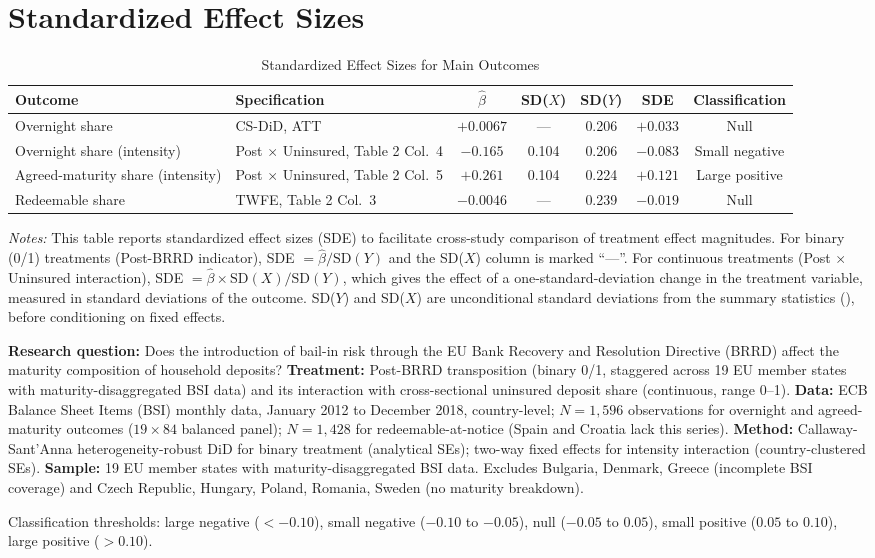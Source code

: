 \documentclass[12pt]{article}
\begin{document}
\section{Standardized Effect Sizes}
\label{sec:sde}

\begin{table}[H]
\centering
\caption{Standardized Effect Sizes for Main Outcomes}
\label{tab:sde}
\begin{adjustbox}{max width=\textwidth}
\begin{tabular}{llccccc}
\toprule
Outcome & Specification & $\hat{\beta}$ & SD($X$) & SD($Y$) & SDE & Classification \\
\midrule
Overnight share & CS-DiD, ATT & $+0.0067$ & --- & 0.206 & $+0.033$ & Null \\
Overnight share (intensity) & Post $\times$ Uninsured, Table 2 Col.\ 4 & $-0.165$ & 0.104 & 0.206 & $-0.083$ & Small negative \\
Agreed-maturity share (intensity) & Post $\times$ Uninsured, Table 2 Col.\ 5 & $+0.261$ & 0.104 & 0.224 & $+0.121$ & Large positive \\
Redeemable share & TWFE, Table 2 Col.\ 3 & $-0.0046$ & --- & 0.239 & $-0.019$ & Null \\
\bottomrule
\end{tabular}
\end{adjustbox}
\par\vspace{0.3em}
{\footnotesize \emph{Notes:} This table reports standardized effect sizes (SDE)
to facilitate cross-study comparison of treatment effect magnitudes.
For binary (0/1) treatments (Post-BRRD indicator), SDE $= \hat{\beta} / \text{SD}(Y)$ and the SD($X$)
column is marked ``---''.
For continuous treatments (Post $\times$ Uninsured interaction), SDE $= \hat{\beta} \times \text{SD}(X) / \text{SD}(Y)$,
which gives the effect of a one-standard-deviation change in the treatment variable,
measured in standard deviations of the outcome.
SD($Y$) and SD($X$) are unconditional standard deviations from the summary
statistics (), before conditioning on fixed effects.

\textbf{Research question:} Does the introduction of bail-in risk through the EU Bank Recovery and Resolution Directive (BRRD) affect the maturity composition of household deposits?
\textbf{Treatment:} Post-BRRD transposition (binary 0/1, staggered across 19 EU member states with maturity-disaggregated BSI data) and its interaction with cross-sectional uninsured deposit share (continuous, range 0--1).
\textbf{Data:} ECB Balance Sheet Items (BSI) monthly data, January 2012 to December 2018, country-level; $N = 1{,}596$ observations for overnight and agreed-maturity outcomes ($19 \times 84$ balanced panel); $N = 1{,}428$ for redeemable-at-notice (Spain and Croatia lack this series).
\textbf{Method:} Callaway-Sant'Anna heterogeneity-robust DiD for binary treatment (analytical SEs); two-way fixed effects for intensity interaction (country-clustered SEs).
\textbf{Sample:} 19 EU member states with maturity-disaggregated BSI data. Excludes Bulgaria, Denmark, Greece (incomplete BSI coverage) and Czech Republic, Hungary, Poland, Romania, Sweden (no maturity breakdown).

Classification thresholds:
large negative ($< -0.10$), small negative ($-0.10$ to $-0.05$),
null ($-0.05$ to $0.05$), small positive ($0.05$ to $0.10$),
large positive ($> 0.10$).}
\end{table}
\end{document}
